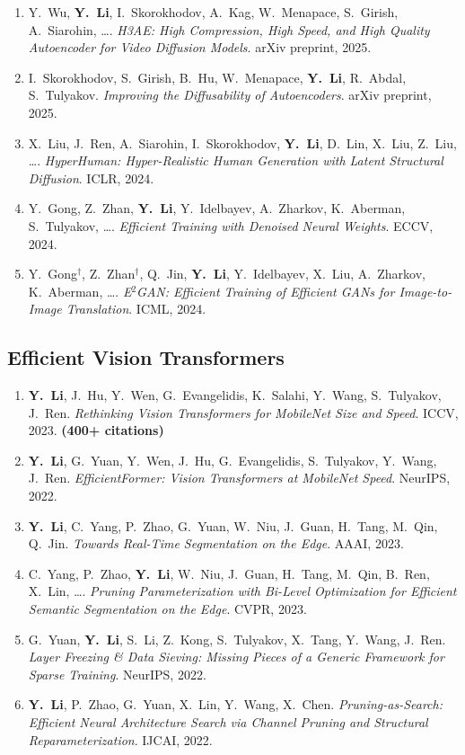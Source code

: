 \documentclass[11pt,letterpaper]{article}
\newcommand{\pub}[4]{%
    \item #1. \textit{#2}. #3, #4.
}
\newcommand{\pubBold}[5]{%
    \item #1. \textit{#2}. #3, #4. \textbf{#5}
}
\begin{document}
\begin{enumerate}[resume]

\pub{Y.\ Wu, \textbf{Y.\ Li}, I.\ Skorokhodov, A.\ Kag, W.\ Menapace, S.\ Girish, A.\ Siarohin, \ldots}
    {H3AE: High Compression, High Speed, and High Quality Autoencoder for Video Diffusion Models}
    {arXiv preprint}{2025}

\pub{I.\ Skorokhodov, S.\ Girish, B.\ Hu, W.\ Menapace, \textbf{Y.\ Li}, R.\ Abdal, S.\ Tulyakov}
    {Improving the Diffusability of Autoencoders}
    {arXiv preprint}{2025}

\pub{X.\ Liu, J.\ Ren, A.\ Siarohin, I.\ Skorokhodov, \textbf{Y.\ Li}, D.\ Lin, X.\ Liu, Z.\ Liu, \ldots}
    {HyperHuman: Hyper-Realistic Human Generation with Latent Structural Diffusion}
    {ICLR}{2024}

\pub{Y.\ Gong, Z.\ Zhan, \textbf{Y.\ Li}, Y.\ Idelbayev, A.\ Zharkov, K.\ Aberman, S.\ Tulyakov, \ldots}
    {Efficient Training with Denoised Neural Weights}
    {ECCV}{2024}

\pub{Y.\ Gong$^\dagger$, Z.\ Zhan$^\dagger$, Q.\ Jin, \textbf{Y.\ Li}, Y.\ Idelbayev, X.\ Liu, A.\ Zharkov, K.\ Aberman, \ldots}
    {E$^2$GAN: Efficient Training of Efficient GANs for Image-to-Image Translation}
    {ICML}{2024}

\end{enumerate}

\subsection*{Efficient Vision Transformers}

\begin{enumerate}[resume]

\pubBold{\textbf{Y.\ Li}, J.\ Hu, Y.\ Wen, G.\ Evangelidis, K.\ Salahi, Y.\ Wang, S.\ Tulyakov, J.\ Ren}
    {Rethinking Vision Transformers for MobileNet Size and Speed}
    {ICCV}{2023}{(400+ citations)}

\pub{\textbf{Y.\ Li}, G.\ Yuan, Y.\ Wen, J.\ Hu, G.\ Evangelidis, S.\ Tulyakov, Y.\ Wang, J.\ Ren}
    {EfficientFormer: Vision Transformers at MobileNet Speed}
    {NeurIPS}{2022}

\pub{\textbf{Y.\ Li}, C.\ Yang, P.\ Zhao, G.\ Yuan, W.\ Niu, J.\ Guan, H.\ Tang, M.\ Qin, Q.\ Jin}
    {Towards Real-Time Segmentation on the Edge}
    {AAAI}{2023}

\pub{C.\ Yang, P.\ Zhao, \textbf{Y.\ Li}, W.\ Niu, J.\ Guan, H.\ Tang, M.\ Qin, B.\ Ren, X.\ Lin, \ldots}
    {Pruning Parameterization with Bi-Level Optimization for Efficient Semantic Segmentation on the Edge}
    {CVPR}{2023}

\pub{G.\ Yuan, \textbf{Y.\ Li}, S.\ Li, Z.\ Kong, S.\ Tulyakov, X.\ Tang, Y.\ Wang, J.\ Ren}
    {Layer Freezing \& Data Sieving: Missing Pieces of a Generic Framework for Sparse Training}
    {NeurIPS}{2022}

\pub{\textbf{Y.\ Li}, P.\ Zhao, G.\ Yuan, X.\ Lin, Y.\ Wang, X.\ Chen}
    {Pruning-as-Search: Efficient Neural Architecture Search via Channel Pruning and Structural Reparameterization}
    {IJCAI}{2022}

\end{enumerate}
\end{document}
